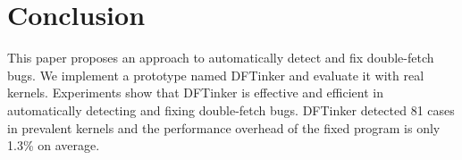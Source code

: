 \documentclass[10pt]{llncs}
\begin{document}






\section{Conclusion}
\label{conclusion}

This paper proposes an approach to automatically detect and fix double-fetch bugs. We implement a prototype named DFTinker and evaluate it with real kernels. Experiments show that DFTinker is effective and efficient in automatically detecting and fixing double-fetch bugs. DFTinker detected 81 cases in prevalent kernels and the performance overhead of the fixed program is only 1.3\% on average.








\end{document}
